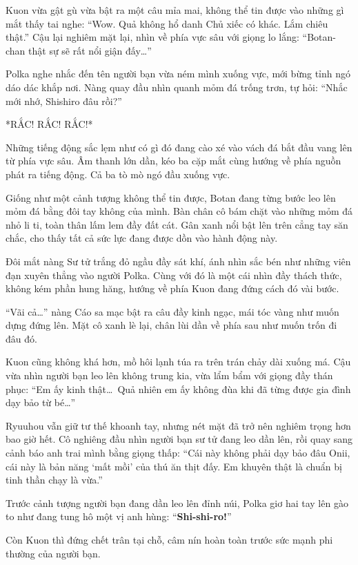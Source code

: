 \documentclass[../main.tex]{subfiles}
\begin{document}
Kuon vừa gật gù vừa bật ra một câu mỉa mai, không thể tin được vào những gì mắt thấy tai nghe: ``Wow. Quả không hổ danh Chủ xiếc có khác. Lắm chiêu thật.'' Cậu lại nghiêm mặt lại, nhìn về phía vực sâu với giọng lo lắng: ``Botan-chan thật sự sẽ rất nổi giận đấy\dots''

Polka nghe nhắc đến tên người bạn vừa ném mình xuống vực, mới bừng tỉnh ngó dáo dác khắp nơi. Nàng quay đầu nhìn quanh mỏm đá trống trơn, tự hỏi: ``Nhắc mới nhớ, Shishiro đâu rồi?''

*RẮC! RẮC! RẮC!*

Những tiếng động sắc lẹm như có gì đó đang cào xé vào vách đá bắt đầu vang lên từ phía vực sâu. Âm thanh lớn dần, kéo ba cặp mắt cùng hướng về phía nguồn phát ra tiếng động. Cả ba tò mò ngó đầu xuống vực.

Giống như một cảnh tượng không thể tin được, Botan đang từng bước leo lên mỏm đá bằng đôi tay không của mình. Bàn chân cô bám chặt vào những mỏm đá nhỏ li ti, toàn thân lấm lem đầy đất cát. Gân xanh nổi bật lên trên cẳng tay săn chắc, cho thấy tất cả sức lực đang được dồn vào hành động này.

Đôi mắt nàng Sư tử trắng đỏ ngầu đầy sát khí, ánh nhìn sắc bén như những viên đạn xuyên thẳng vào người Polka. Cùng với đó là một cái nhìn đầy thách thức, không kém phần hung hăng, hướng về phía Kuon đang đứng cách đó vài bước.


``Vãi cả\dots'' nàng Cáo sa mạc bật ra câu đầy kinh ngạc, mái tóc vàng như muốn dựng đứng lên. Mặt cô xanh lè lại, chân lùi dần về phía sau như muốn trốn đi đâu đó.

Kuon cũng không khá hơn, mồ hôi lạnh túa ra trên trán chảy dài xuống má. Cậu vừa nhìn người bạn leo lên không trung kia, vừa lẩm bẩm với giọng đầy thán phục: ``Em ấy kinh thật\dots\ Quả nhiên em ấy không đùa khi đã từng được gia đình dạy bảo từ bé\dots''

Ryuuhou vẫn giữ tư thế khoanh tay, nhưng nét mặt đã trở nên nghiêm trọng hơn bao giờ hết. Cô nghiêng đầu nhìn người bạn sư tử đang leo dần lên, rồi quay sang cảnh báo anh trai mình bằng giọng thấp: ``Cái này không phải dạy bảo đâu Onii, cái này là bản năng `mất mồi' của thú ăn thịt đấy. Em khuyên thật là chuẩn bị tinh thần chạy là vừa.''

Trước cảnh tượng người bạn đang dần leo lên đỉnh núi, Polka giơ hai tay lên gào to như đang tung hô một vị anh hùng: ``\textbf{Shi-shi-ro!}''

Còn Kuon thì đứng chết trân tại chỗ, câm nín hoàn toàn trước sức mạnh phi thường của người bạn.
\end{document}
